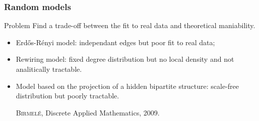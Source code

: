 \documentclass{beamer}
\begin{document}


\begin{frame}
\frametitle{Random models}

\begin{block}{Problem}
Find a trade-off between the fit to real data and theoretical maniability.
\end{block}

\begin{itemize}
\item Erd\H{o}s-R\'enyi model: independant edges but poor fit to real data;

\item Rewiring model: fixed degree distribution but no local density and not analitically tractable.

\item Model based on the projection of a hidden bipartite structure: scale-free distribution but poorly tractable.

{\tiny \textsc{Birmel\'e}, Discrete Applied Mathematics, 2009.}

\end{itemize}

\end{frame}


















\end{document}
